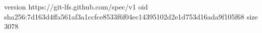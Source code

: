 version https://git-lfs.github.com/spec/v1
oid sha256:7d163d4ffa561af3a1ccfce8533f6f04ec14395102d2e1d753d16ada9f105f68
size 3078
